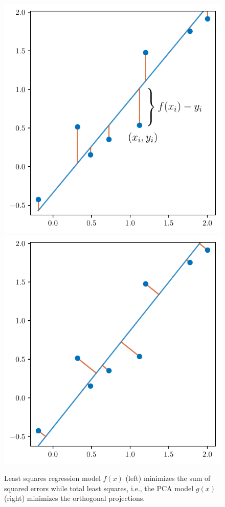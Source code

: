 \begin{figure}
\centering
\includegraphics[width=.49\linewidth]{figs/fig-least-squares.pdf}
\hfill
\includegraphics[width=.49\linewidth]{figs/fig-pca-fit.pdf}
\caption{Least squares regression model \(f(x)\) (left) minimizes the sum of squared errors while total least squares, i.e., the PCA model \(g(x)\) (right) minimizes the orthogonal projections.}
\label{fig:ols-pca}
\end{figure}